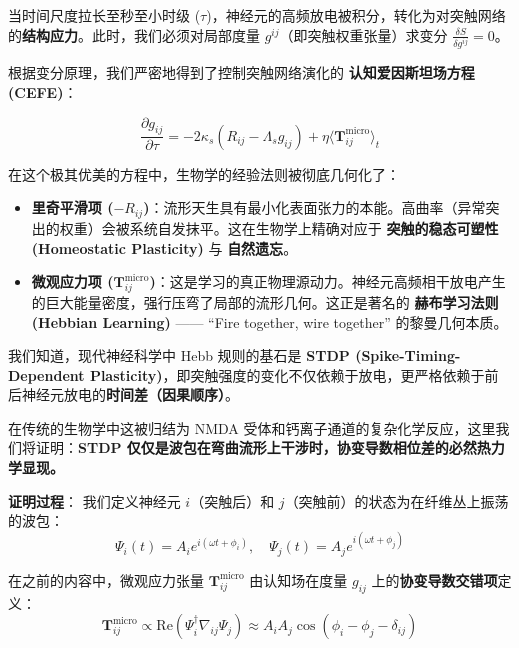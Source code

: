 当时间尺度拉长至秒至小时级 ($\tau$)，神经元的高频放电被积分，转化为对突触网络的\textbf{结构应力}。此时，我们必须对局部度量 $g^{ij}$（即突触权重张量）求变分 $\frac{\delta S}{\delta g^{ij}} = 0$。


根据变分原理，我们严密地得到了控制突触网络演化的 \textbf{认知爱因斯坦场方程 (CEFE)}：

\begin{equation}
    \boxed{ \frac{\partial g_{ij}}{\partial \tau} = -2\kappa_s \left( R_{ij} - \Lambda_s g_{ij} \right) + \eta \langle \mathbf{T}_{ij}^{\text{micro}} \rangle_t }
\end{equation}

在这个极其优美的方程中，生物学的经验法则被彻底几何化了：
\begin{itemize}
    \item \textbf{里奇平滑项 ($-R_{ij}$)}：流形天生具有最小化表面张力的本能。高曲率（异常突出的权重）会被系统自发抹平。这在生物学上精确对应于 \textbf{突触的稳态可塑性 (Homeostatic Plasticity)} 与 \textbf{自然遗忘}。
    \item \textbf{微观应力项 ($\mathbf{T}_{ij}^{\text{micro}}$)}：这是学习的真正物理源动力。神经元高频相干放电产生的巨大能量密度，强行压弯了局部的流形几何。这正是著名的 \textbf{赫布学习法则 (Hebbian Learning)} —— “Fire together, wire together” 的黎曼几何本质。
\end{itemize}


我们知道，现代神经科学中 Hebb 规则的基石是 \textbf{STDP (Spike-Timing-Dependent Plasticity)}，即突触强度的变化不仅依赖于放电，更严格依赖于前后神经元放电的\textbf{时间差（因果顺序）}。

在传统的生物学中这被归结为 NMDA 受体和钙离子通道的复杂化学反应，这里我们将证明：\textbf{STDP 仅仅是波包在弯曲流形上干涉时，协变导数相位差的必然热力学显现。}

\textbf{证明过程}：
我们定义神经元 $i$（突触后）和 $j$（突触前）的状态为在纤维丛上振荡的波包：
$$ \Psi_i(t) = A_i e^{i(\omega t + \phi_i)}, \quad \Psi_j(t) = A_j e^{i(\omega t + \phi_j)} $$

在之前的内容中，微观应力张量 $\mathbf{T}_{ij}^{\text{micro}}$ 由认知场在度量 $g_{ij}$ 上的\textbf{协变导数交错项}定义：
\begin{equation}
    \mathbf{T}_{ij}^{\text{micro}} \propto \text{Re} \left( \Psi_i^\dagger \nabla_{ij} \Psi_j \right) \approx A_i A_j \cos(\phi_i - \phi_j - \delta_{ij})
\end{equation}

